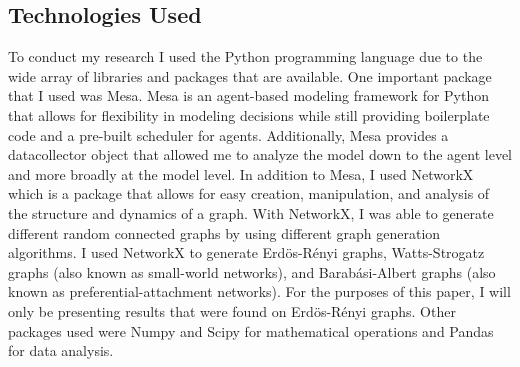 \subsection{Technologies Used}
To conduct my research I used the Python programming language due to the wide array of libraries and packages that are available. One important package that I used was Mesa. Mesa is an agent-based modeling framework for Python that allows for flexibility in modeling decisions while still providing boilerplate code and a pre-built scheduler for agents. Additionally, Mesa provides a datacollector object that allowed me to analyze the model down to the agent level and more broadly at the model level. In addition to Mesa, I used NetworkX which is a package that allows for easy creation, manipulation, and analysis of the structure and dynamics of a graph. With NetworkX, I was able to generate different random connected graphs by using different graph generation algorithms. I used NetworkX to generate Erd\"{o}s-R\'{e}nyi
graphs, Watts-Strogatz graphs (also known as small-world networks), and Barab\'{a}si-Albert graphs (also known as preferential-attachment networks). For the purposes of this paper, I will only be presenting results that were found on Erd\"{o}s-R\'{e}nyi graphs. Other packages used were Numpy and Scipy for mathematical operations and Pandas for data analysis. 